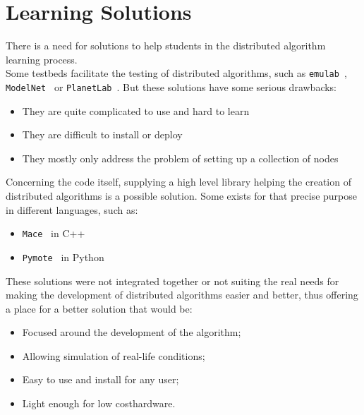\documentclass{eplmastersthesis}
\begin{document}
    \section{Learning Solutions}

      There is a need for solutions to help students in the distributed
      algorithm learning process.\\

      Some testbeds facilitate the testing of distributed algorithms, such as
      \texttt{emulab}~\cite{Emulab}, \texttt{ModelNet}~\cite{ModelNet} or
      \texttt{PlanetLab}~\cite{PlanetLab}. But these solutions have some serious
      drawbacks:

      \begin{itemize}
        \item They are quite complicated to use and hard to learn
        \item They are difficult to install or deploy
        \item They mostly only address the problem of setting up a collection
        of nodes
      \end{itemize}

      Concerning the code itself, supplying a high level library helping the
      creation of distributed algorithms is a possible solution. Some
      exists for that precise purpose in different languages, such as:

      \begin{itemize}
        \item \texttt{Mace}~\cite{Mace} in C++
        \item \texttt{Pymote}~\cite{Pymote} in Python
      \end{itemize}

      These solutions were not integrated together or not suiting the real needs
      for making the development of distributed algorithms easier and better,
      thus offering a place for a better solution that would be:

      \begin{itemize}
        \item Focused around the development of the algorithm;
        \item Allowing simulation of real-life conditions;
        \item Easy to use and install for any user;
        \item Light enough for low costhardware.
      \end{itemize}
\end{document}
